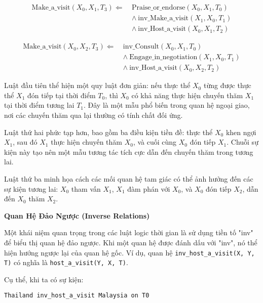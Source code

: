 \begin{equation}
\begin{aligned}
\text{Make\_a\_visit}(X_0, X_1, T_3) \Leftarrow\ &\text{Praise\_or\_endorse}(X_0, X_1, T_0) \\
&\land\ \text{inv\_Make\_a\_visit}(X_1, X_0, T_1) \\
&\land\ \text{inv\_Host\_a\_visit}(X_0, X_1, T_2)
\end{aligned}
\label{rule2}
\end{equation}

\begin{equation}
\begin{aligned}
\text{Make\_a\_visit}(X_0, X_2, T_3) \Leftarrow\ &\text{inv\_Consult}(X_0, X_1, T_0) \\
&\land\ \text{Engage\_in\_negotiation}(X_1, X_0, T_1) \\
&\land\ \text{inv\_Host\_a\_visit}(X_0, X_2, T_2)
\end{aligned}
\label{rule3}
\end{equation}


Luật đầu tiên thể hiện một quy luật đơn giản: nếu thực thể $X_0$ từng được thực thể $X_1$ đón tiếp tại thời điểm $T_0$, thì $X_0$ có khả năng thực hiện chuyến thăm $X_1$ tại thời điểm tương lai $T_1$. Đây là một mẫu phổ biến trong quan hệ ngoại giao, nơi các chuyến thăm qua lại thường có tính chất đối ứng.

Luật thứ hai phức tạp hơn, bao gồm ba điều kiện tiền đề: thực thể $X_0$ khen ngợi $X_1$, sau đó $X_1$ thực hiện chuyến thăm $X_0$, và cuối cùng $X_0$ đón tiếp $X_1$. Chuỗi sự kiện này tạo nên một mẫu tương tác tích cực dẫn đến chuyến thăm trong tương lai.

Luật thứ ba minh họa cách các mối quan hệ tam giác có thể ảnh hưởng đến các sự kiện tương lai: $X_0$ tham vấn $X_1$, $X_1$ đàm phán với $X_0$, và $X_0$ đón tiếp $X_2$, dẫn đến $X_0$ thăm $X_2$.

\textbf{Quan Hệ Đảo Ngược (Inverse Relations)}

Một khái niệm quan trọng trong các luật logic thời gian là sử dụng tiền tố "inv" để biểu thị quan hệ đảo ngược. Khi một quan hệ được đánh dấu với "inv", nó thể hiện hướng ngược lại của quan hệ gốc. Ví dụ, quan hệ \texttt{inv\_host\_a\_visit(X, Y, T)} có nghĩa là \texttt{host\_a\_visit(Y, X, T)}.

Cụ thể, khi ta có sự kiện:
\begin{center}
\texttt{Thailand inv\_host\_a\_visit Malaysia on T0}
\end{center}

